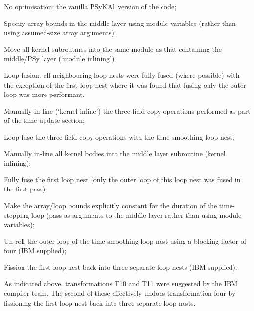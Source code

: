 \documentclass{IOS-Book-Article}
\newcommand{\psykal}{{PS}y{KA}l}
\begin{document}
\begin{list}{T.}{\setlength{\rightmargin}{\leftmargin}}

\item No optimisation: the vanilla \psykal\ version of the code;

\item Specify array bounds in the middle layer using module variables
  (rather than using assumed-size array arguments);

\item Move all kernel subroutines into the same module as that
  containing the middle/PSy layer (`module inlining');

\item Loop fusion: all neighbouring loop nests were fully fused (where
  possible) with the exception of the first loop nest where it was
  found that fusing only the outer loop was more performant.

\item Manually in-line (`kernel inline') the three field-copy operations
  performed as part of the time-update section;

\item Loop fuse the three field-copy operations with the
  time-smoothing loop nest;

\item Manually in-line all kernel bodies into the middle layer
  subroutine (kernel inlining);

\item Fully fuse the first loop nest (only the outer loop of this loop
  nest was fused in the first pass);

\item Make the array/loop bounds explicitly constant for the duration
  of the time-stepping loop (pass as arguments to the middle layer
  rather than using module variables);

\item Un-roll the outer loop of the time-smoothing loop nest using a
blocking factor of four (IBM supplied);

\item Fission the first loop nest back into three separate loop nests
  (IBM supplied).

\end{list}

As indicated above, transformations T10 and T11 were
suggested by the IBM compiler team. The second of these effectively
undoes transformation four by fissioning the first loop nest back
into three separate loop nests.
\end{document}

